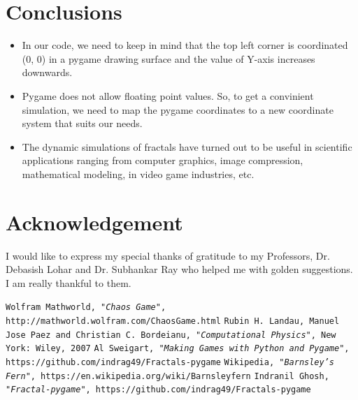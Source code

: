 \documentclass{article}
\begin{document}
\section{Conclusions}
\begin{itemize}
\item In our code, we need to keep in mind that the top left corner is coordinated (0, 0) in a pygame drawing surface and the value of Y-axis increases downwards.
\item Pygame does not allow floating point values. So, to get a convinient simulation, we need to map the pygame coordinates to a new coordinate system that suits our needs.
\item The dynamic simulations of fractals have turned out to be useful in scientific applications ranging from computer graphics, image compression, mathematical modeling, in video game industries, etc.
\end{itemize}
\section{Acknowledgement}
I would like to express my special thanks of gratitude to my Professors, Dr. Debasish Lohar and Dr. Subhankar Ray who helped me with golden suggestions. I am really thankful to them.

\begin{thebibliography}{10}
\texttt{Wolfram Mathworld, \textit{"Chaos Game"}, http://mathworld.wolfram.com/ChaosGame.html}
\texttt{Rubin H. Landau, Manuel Jose Paez and Christian C. Bordeianu, \textit{"Computational Physics"}, New York: Wiley, 2007}
\texttt{Al Sweigart, \textit{"Making Games with Python and Pygame"}, https://github.com/indrag49/Fractals-pygame}
\texttt{Wikipedia, \textit{"Barnsley's Fern"}, https://en.wikipedia.org/wiki/Barnsleyfern}
\texttt{Indranil Ghosh, \textit{"Fractal-pygame"}, https://github.com/indrag49/Fractals-pygame}
\end{thebibliography}
\end{document}
